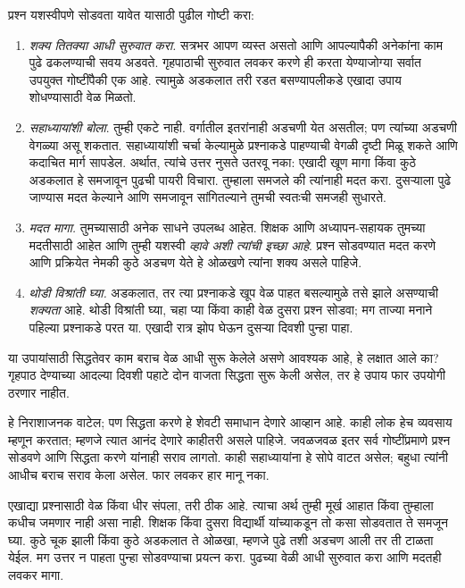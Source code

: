 प्रश्न यशस्वीपणे सोडवता यावेत यासाठी पुढील गोष्टी करा:
\begin{enumerate}
\item \emph{शक्य तितक्या आधी सुरुवात करा.} सत्रभर आपण व्यस्त असतो आणि आपल्यापैकी अनेकांना काम पुढे ढकलण्याची सवय अडवते. गृहपाठाची सुरुवात लवकर करणे ही करता येण्याजोग्या सर्वात उपयुक्त गोष्टींपैकी एक आहे. त्यामुळे अडकलात तरी रडत बसण्यापलीकडे एखादा उपाय शोधण्यासाठी वेळ मिळतो.
\item \emph{सहाध्यायांशी बोला}. तुम्ही एकटे नाही. वर्गातील इतरांनाही अडचणी येत असतील; पण त्यांच्या अडचणी वेगळ्या असू शकतात. सहाध्यायांशी चर्चा केल्यामुळे प्रश्नाकडे पाहण्याची वेगळी दृष्टी मिळू शकते आणि कदाचित मार्ग सापडेल. अर्थात, त्यांचे उत्तर नुसते उतरवू नका: एखादी खूण मागा किंवा कुठे अडकलात हे समजावून पुढची पायरी विचारा. तुम्हाला समजले की त्यांनाही मदत करा. दुसऱ्याला पुढे जाण्यास मदत केल्याने आणि समजावून सांगितल्याने तुमची स्वतःची समजही सुधारते.
\item \emph{मदत मागा.} तुमच्यासाठी अनेक साधने उपलब्ध आहेत. शिक्षक आणि अध्यापन-सहायक तुमच्या मदतीसाठी आहेत आणि तुम्ही यशस्वी \emph{व्हावे अशी त्यांची इच्छा आहे}. प्रश्न सोडवण्यात मदत करणे आणि प्रक्रियेत नेमकी कुठे अडचण येते हे ओळखणे त्यांना शक्य असले पाहिजे.
\item \emph{थोडी विश्रांती घ्या.} अडकलात, तर त्या प्रश्नाकडे खूप वेळ पाहत बसल्यामुळे तसे झाले असण्याची \emph{शक्यता} आहे. थोडी विश्रांती घ्या, चहा प्या किंवा काही वेळ दुसरा प्रश्न सोडवा; मग ताज्या मनाने पहिल्या प्रश्नाकडे परत या. एखादी रात्र झोप घेऊन दुसऱ्या दिवशी पुन्हा पाहा.
\end{enumerate}

या उपायांसाठी सिद्धतेवर काम बराच वेळ आधी सुरू केलेले असणे आवश्यक आहे, हे लक्षात आले का? गृहपाठ देण्याच्या आदल्या दिवशी पहाटे दोन वाजता सिद्धता सुरू केली असेल, तर हे उपाय फार उपयोगी ठरणार नाहीत.

हे निराशाजनक वाटेल; पण सिद्धता करणे हे शेवटी समाधान देणारे आव्हान आहे. काही लोक हेच व्यवसाय म्हणून करतात; म्हणजे त्यात आनंद देणारे काहीतरी असले पाहिजे. जवळजवळ इतर सर्व गोष्टींप्रमाणे प्रश्न सोडवणे आणि सिद्धता करणे यांनाही सराव लागतो. काही सहाध्यायांना हे सोपे वाटत असेल; बहुधा त्यांनी आधीच बराच सराव केला असेल. फार लवकर हार मानू नका.

एखाद्या प्रश्नासाठी वेळ किंवा धीर संपला, तरी ठीक आहे. त्याचा अर्थ तुम्ही मूर्ख आहात किंवा तुम्हाला कधीच जमणार नाही असा नाही. शिक्षक किंवा दुसरा विद्यार्थी यांच्याकडून तो कसा सोडवतात ते समजून घ्या. कुठे चूक झाली किंवा कुठे अडकलात ते ओळखा, म्हणजे पुढे तशी अडचण आली तर ती टाळता येईल. मग उत्तर न पाहता पुन्हा सोडवण्याचा प्रयत्न करा. पुढच्या वेळी आधी सुरुवात करा आणि मदतही लवकर मागा.












